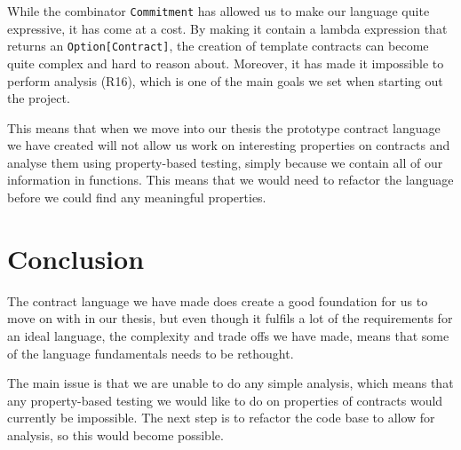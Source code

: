 \documentclass{ituthesis}
\begin{document}
While the combinator \texttt{Commitment} has allowed us to make our language quite expressive, it has come at a cost. By making it contain a lambda expression that returns an \texttt{Option[Contract]}, the creation of template contracts can become quite complex and hard to reason about. Moreover, it has made it impossible to perform analysis (R16), which is one of the main goals we set when starting out the project.

This means that when we move into our thesis the prototype contract language we have created will not allow us work on interesting properties on contracts and analyse them using property-based testing, simply because we contain all of our information in functions. This means that we would need to refactor the language before we could find any meaningful properties.

\chapter{Conclusion}
The contract language we have made does create a good foundation for us to move on with in our thesis, but even though it fulfils a lot of the requirements for an ideal language, the complexity and trade offs we have made, means that some of the language fundamentals needs to be rethought.

The main issue is that we are unable to do any simple analysis, which means that any property-based testing we would like to do on properties of contracts would currently be impossible. The next step is to refactor the code base to allow for analysis, so this would become possible.



\printbibliography
\end{document}
